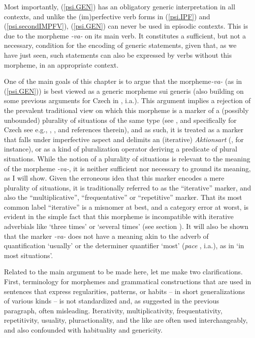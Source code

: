 \documentclass[output=paper,colorlinks,citecolor=brown]{langscibook}
\begin{document}
Most importantly, (\ref{psi.GEN}) has an obligatory generic interpretation in all contexts, and unlike 
the (im)perfective verb forms in (\ref{psi.IPF}) and (\ref{psi.secondIMPFV}), (\ref{psi.GEN}) can never be used 
in episodic contexts. This is due to the morpheme 
\textit{-va-} on its main verb. It constitutes a sufficient, but not a necessary, condition for the 
encoding of generic statements, given that, as we have 
just seen, such statements can also be expressed by verbs without this morpheme, in an appropriate context. 

One of the main goals of this chapter is to argue that the 
morpheme\linebreak \textit{-va-} (as in (\ref{psi.GEN})) is best viewed as a generic morpheme sui generis (also building on some previous arguments for Czech in \citet{filip1993berkeleyva,filip1994mitva,filip1997suigenva, Mendia2018,filip2021cologneva}, i.a.).
This argument implies a rejection of the prevalent traditional view on which this morpheme is a marker of a (possibly unbounded) plurality of situations of the same type (see \citealt{Genis2021}, and specifically for Czech see e.g., \citealt{petr1986mluvnice,dahl1995}, \citealt{nuebler2017}, and references therein), 
and as such, it is treated as a marker
that falls under imperfective aspect and delimits an (iterative) \textit{Aktionsart} (\citealt{poldauf1964}, for instance), or
as a kind of pluralization operator deriving a predicate of plural situations. 
While the notion of a plurality of situations is relevant to 
the meaning of the morpheme \textit{-va-}, it is neither sufficient nor necessary to ground its meaning, as I will show. Given the erroneous idea that this marker 
encodes a mere plurality of situations,
it is traditionally referred to as the ``iterative'' marker, and also the ``multiplicative'', ``frequentative'' or ``repetitive'' marker.
That its most common label ``iterative'' is a misnomer at best, and a category error at worst, is evident in the simple fact that this morpheme is incompatible with iterative adverbials like `three times' or `several times' (see section ).
It will also be
shown that the marker \textit{-va-} does not have a meaning akin to the adverb of quantification 
`usually' or the determiner quantifier `most' (\textit{pace} \citealt{dahl1995}, i.a.), as in `in most situations'. 

Related to the main argument to be made here, 
let me make two clarifications.  
First, terminology for morphemes and grammatical constructions that are used in sentences that express regularities, patterns, or habits -- in short generalizations of various kinds -- is not standardized and, as suggested in the previous paragraph, often misleading.  
Iterativity, multiplicativity,  frequentativity, repetitivity, usuality, pluractionality, and the like are often used interchangeably,
and also confounded with habituality and genericity. 
\end{document}
